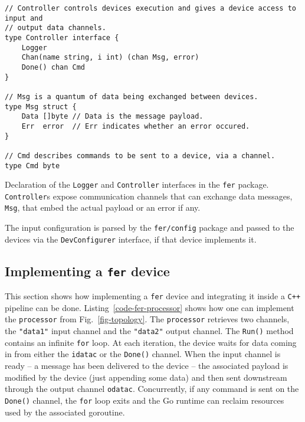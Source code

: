 \documentclass{webofc}
\begin{document}
\begin{listing}[h]
	\centering
	\begin{verbatim}
// Controller controls devices execution and gives a device access to input and
// output data channels.
type Controller interface {
	Logger
	Chan(name string, i int) (chan Msg, error)
	Done() chan Cmd
}

// Msg is a quantum of data being exchanged between devices.
type Msg struct {
	Data []byte // Data is the message payload.
	Err  error  // Err indicates whether an error occured.
}

// Cmd describes commands to be sent to a device, via a channel.
type Cmd byte
	\end{verbatim}
	\caption{Declaration of the \texttt{Logger} and \texttt{Controller} interfaces in the \texttt{fer} package.
	\texttt{Controller}s expose communication channels that can exchange data messages, \texttt{Msg}, that embed the actual payload or an error if any.
}
	\label{code-fer-controller}
\end{listing}

The input configuration is parsed by the \texttt{fer/config} package and passed to the devices via the \texttt{DevConfigurer} interface, if that device implements it.

\subsection{Implementing a \texttt{fer} device}
This section shows how implementing a \texttt{fer} device and integrating it inside a \texttt{C++} pipeline can be done.
Listing~\ref{code-fer-processor} shows how one can implement the \texttt{processor} from Fig.~\ref{fig-topology}.
The \texttt{processor} retrieves two channels, the \texttt{"data1"} input channel and the \texttt{"data2"} output channel.
The \texttt{Run()} method contains an infinite \texttt{for} loop.
At each iteration, the device waits for data coming in from either the \texttt{idatac} or the \texttt{Done()} channel.
When the input channel is ready -- a message has been delivered to the device -- the associated payload is modified by the device (just appending some data) and then sent downstream through the output channel \texttt{odatac}.
Concurrently, if any command is sent on the \texttt{Done()} channel, the \texttt{for} loop exits and the Go runtime can reclaim resources used by the associated goroutine.
\end{document}
